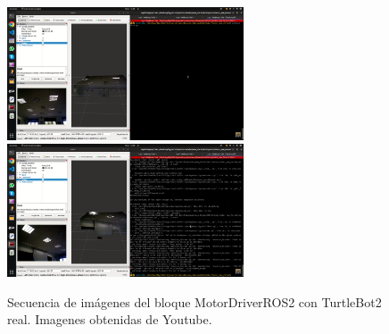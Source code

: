 \begin{figure} [H]
  \begin{center}
      \includegraphics[width=7cm]{figs/c4/motorR1.png}
      \includegraphics[width=7cm]{figs/c4/motorR2.png}
  \end{center}
  \caption[Secuencia bloque MotorDriverROS2 real]{Secuencia de imágenes del bloque MotorDriverROS2 con TurtleBot2 real. Imagenes obtenidas de Youtube\footnotemark.}
  \label{fig:vid_motR}
\end{figure}

